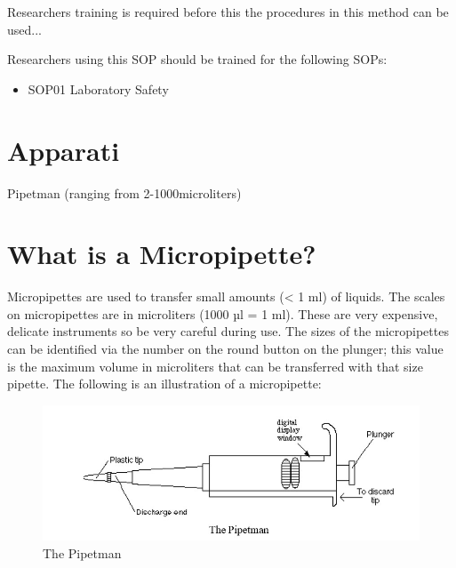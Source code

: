 \documentclass[12pt]{../SOP3_beta}\usepackage[]{graphicx}\usepackage[]{color}
\begin{document}
\NP Researchers training is required before this the procedures in this method can be used... 

\NP Researchers using this SOP should be trained for the following SOPs:

\begin{itemize}
  \item SOP01 Laboratory Safety
\end{itemize} 

\section{Apparati}

\NP Pipetman (ranging from 2-1000microliters)
\section {What is a Micropipette?}
Micropipettes are used to transfer small amounts (< 1 ml) of liquids. The scales on micropipettes are in microliters (1000 µl = 1 ml). These are very expensive, delicate instruments so be very careful during use. The sizes of the micropipettes can be identified via the number on the round button on the plunger; this value is the maximum volume in microliters that can be transferred with that size pipette. The following is an illustration of a micropipette:
\begin{figure} [H!]
\caption{The Pipetman}
\includegraphics{pipetman.jpg}
\end{figure}
\end{document}
